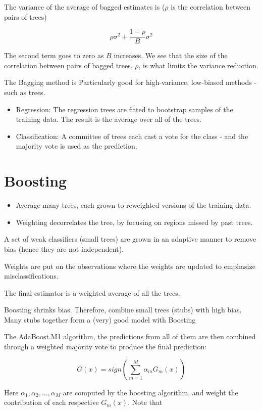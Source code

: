 The variance of the average of bagged estimates is ($\rho$ is the
correlation between pairs of trees)

\[
    \rho \sigma^2 + \frac{1- \rho}{B} \sigma^2
\]

The second term goes to zero as $B$ increases. We see that the size of the correlation between pairs of bagged trees, $\rho$, is what limits the variance reduction.

The Bagging method is Particularly good for high-variance, low-biased methods - such as trees.

\begin{itemize}
  \item Regression: The regression trees are fitted to bootstrap samples of the training data. The result is the average over all of the trees.
  \item Classification: A committee of trees each cast a vote for the class - and the majority vote is used as the prediction.
\end{itemize}

\section{Boosting}

\begin{itemize}
  \item Average many trees, each grown to reweighted versions of the training data.
  \item Weighting decorrelates the tree, by focusing on regions missed by past trees.
\end{itemize}

A set of weak classifiers (small trees) are grown in an adaptive
manner to remove bias (hence they are not independent).

Weights are put on the observations where the weights are updated to emphasize misclassifications.

The final estimator is a weighted average of all the trees.

Boosting shrinks bias. Therefore, combine small trees (stubs) with high bias. Many stubs together form a (very) good model with Boosting


The AdaBoost.M1 algorithm, the predictions from all of them are then combined through a weighted majority vote to produce the final prediction:

\[
    G(x) = sign \left( \sum_{m=1}^{M} \alpha_m G_m (x) \right)
\]

Here $\alpha_1, \alpha_2, ... , \alpha_M$ are computed by the boosting algorithm, and weight the contribution of each respective $G_m(x)$. Note that 


